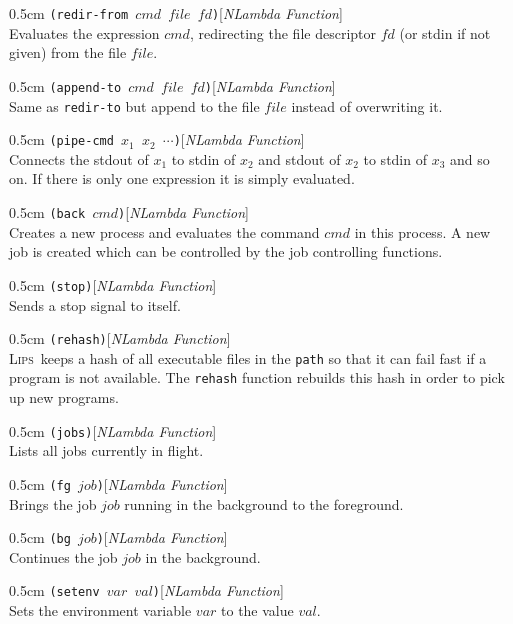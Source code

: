 \documentclass[a4paper]{article}
\newcommand{\lips}{\textsc{Lips}}
\newcommand{\lisp}[1]{\texttt{#1}}
\newcommand{\xargs}{$x_{1}$ $x_{2}$ $\cdots$}
\newenvironment{defun}[2]{\begin{adjustwidth}{0.5cm}{}
    {\hspace*{-0.5cm}\lisp{#2}\hfill[\textit{#1}]\\}}
               {\end{adjustwidth}}
\begin{document}
\begin{defun}{NLambda Function}{(redir-from $cmd$ $file$ $fd$)}
  Evaluates the expression $cmd$, redirecting the file descriptor $fd$
  (or stdin if not given) from the file $file$.
\end{defun}

\begin{defun}{NLambda Function}{(append-to $cmd$ $file$ $fd$)}
  Same as \lisp{redir-to} but append to the file $file$ instead of
  overwriting it.
\end{defun}

\begin{defun}{NLambda Function}{(pipe-cmd \xargs)}
  Connects the stdout of $x_{1}$ to stdin of $x_{2}$ and stdout of
  $x_{2}$ to stdin of $x_{3}$ and so on. If there is only one
  expression it is simply evaluated.
\end{defun}

\begin{defun}{NLambda Function}{(back $cmd$)}
  Creates a new process and evaluates the command $cmd$ in this
  process. A new job is created which can be controlled by the job
  controlling functions.
\end{defun}

\begin{defun}{NLambda Function}{(stop)}
  Sends a stop signal to itself.
\end{defun}

\begin{defun}{NLambda Function}{(rehash)}
  \lips\ keeps a hash of all executable files in the \lisp{path} so
  that it can fail fast if a program is not available. The
  \lisp{rehash} function rebuilds this hash in order to pick up new
  programs.
\end{defun}

\begin{defun}{NLambda Function}{(jobs)}
  Lists all jobs currently in flight.
\end{defun}

\begin{defun}{NLambda Function}{(fg $job$)}
  Brings the job $job$ running
  in the background to the foreground.
\end{defun}

\begin{defun}{NLambda Function}{(bg $job$)}
  Continues the job $job$ in the background.
\end{defun}

\begin{defun}{NLambda Function}{(setenv $var$ $val$)}
  Sets the environment variable $var$ to the value $val$.
\end{defun}
\end{document}

